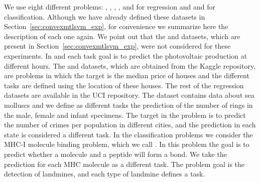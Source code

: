 We use eight different problems: , , , ,  and  for regression and  and  for classification.
Although we have already defined these datasets in Section~\ref{sec:convexmtlsvm_exp}, for convenience we summarize here the description of each one again. We point out that the  and  datasets, which are present in Section~\ref{sec:convexmtlsvm_exp}, were not considered for these experiments.
In  and  each task goal is to predict the photovoltaic production at different hours.
The  and  datasets, which are obtained from the Kaggle repository, are problems in which the target is the median price of houses and the different tasks are defined using the location of these houses.
The rest of the regression datasets are available in the UCI repository.
The  dataset contains data about sea molluscs and we define as different tasks the prediction of the number of rings in the male, female and infant specimens.
The target in the  problem is to predict the number of crimes per population in different cities, and the prediction in each state is considered a different task. 
In the classification problems we consider the MHC-I molecule binding problem, which we call . In this problem the goal is to predict whether a molecule and a peptide will form a bond. We take the prediction for each MHC molecule as a different task.
The 
problem goal is the detection of landmines, and each type of landmine defines a task.
